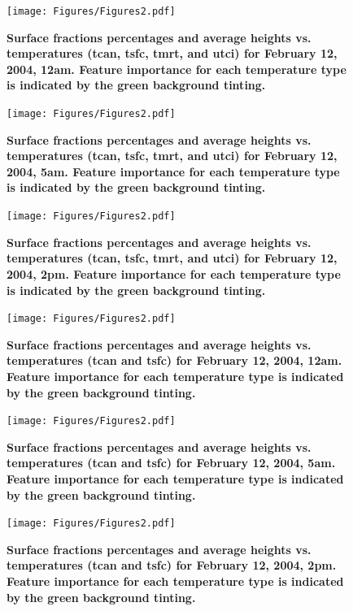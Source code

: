 \documentclass[final,3p,times,authoryear]{elsarticle}
\begin{document}
\begin{figure}
\centering
\texttt{[image: Figures/Figures2.pdf]}
\caption{\bf Surface fractions percentages and average heights vs. temperatures (\gls{tcan}, \gls{tsfc}, \gls{tmrt}, and \gls{utci}) for February 12, 2004, 12am. Feature importance for each temperature type is indicated by the green background tinting.}
 \label{fig:box0}
\end{figure} 

\begin{figure}
\centering
\texttt{[image: Figures/Figures2.pdf]}
\caption{\bf Surface fractions percentages and average heights vs. temperatures (\gls{tcan}, \gls{tsfc}, \gls{tmrt}, and \gls{utci}) for February 12, 2004, 5am. Feature importance for each temperature type is indicated by the green background tinting.}
 \label{fig:box5}
\end{figure} 

\begin{figure}
\centering
\texttt{[image: Figures/Figures2.pdf]}
\caption{\bf Surface fractions percentages and average heights vs. temperatures (\gls{tcan}, \gls{tsfc}, \gls{tmrt}, and \gls{utci}) for February 12, 2004, 2pm. Feature importance for each temperature type is indicated by the green background tinting.}
 \label{fig:box14}
\end{figure} 


\begin{figure}
\centering
\texttt{[image: Figures/Figures2.pdf]}
\caption{\bf Surface fractions percentages and average heights vs. temperatures (\gls{tcan} and \gls{tsfc}) for February 12, 2004, 12am. Feature importance for each temperature type is indicated by the green background tinting.}
 \label{fig:box0a}
\end{figure} 

\begin{figure}
\centering
\texttt{[image: Figures/Figures2.pdf]}
\caption{\bf Surface fractions percentages and average heights vs. temperatures (\gls{tcan} and \gls{tsfc}) for February 12, 2004, 5am. Feature importance for each temperature type is indicated by the green background tinting.}
 \label{fig:box5a}
\end{figure} 

\begin{figure}
\centering
\texttt{[image: Figures/Figures2.pdf]}
\caption{\bf Surface fractions percentages and average heights vs. temperatures (\gls{tcan} and \gls{tsfc}) for February 12, 2004, 2pm. Feature importance for each temperature type is indicated by the green background tinting.}
 \label{fig:box14a}
\end{figure} 
\end{document}
